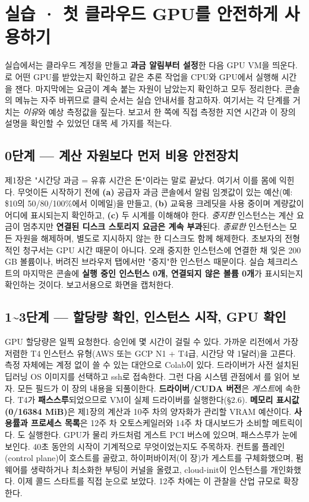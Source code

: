 \section{실습 · 첫 클라우드 GPU를 안전하게 사용하기}

실습에서는 클라우드 계정을 만들고 \textbf{과금 알림부터 설정}한 다음 GPU VM을 띄운다. 로 어떤 GPU를 받았는지 확인하고 같은 추론 작업을 CPU와 GPU에서 실행해 시간을 잰다. 마지막에는 요금이 계속 붙는 자원이 남았는지 확인하고 모두 정리한다. 콘솔의 메뉴는 자주 바뀌므로 클릭 순서는 실습 안내서를 참고하자. 여기서는 각 단계를 거치는 \textit{이유}와 예상 측정값을 짚는다. 보고서 한 쪽에 직접 측정한 지연 시간과 이 장의 설명을 확인할 수 있었던 대목 세 가지를 적는다.

\subsection*{0단계 — 계산 자원보다 먼저 비용 안전장치}

제1장은 "시간당 과금 = 유휴 시간은 돈"이라는 말로 끝났다. 여기서 이를 몸에 익힌다. 무엇이든 시작하기 전에 \textbf{(a)} 공급자 과금 콘솔에서 알림 임곗값이 있는 예산(예: \$10의 50/80/100\%에서 이메일)을 만들고, \textbf{(b)} 교육용 크레딧을 사용 중이며 계량값이 어디에 표시되는지 확인하고, \textbf{(c)} 두 시계를 이해해야 한다. \textit{중지한} 인스턴스는 계산 요금이 멈추지만 \textbf{연결된 디스크 스토리지 요금은 계속 부과}된다. \textit{종료한} 인스턴스는 모든 자원을 해제하며, 별도로 지시하지 않는 한 디스크도 함께 해제한다. 초보자의 전형적인 청구서는 GPU 시간 때문이 아니다. 오래 중지한 인스턴스에 연결한 채 잊은 200 GB 볼륨이나, 버려진 브라우저 탭에서만 "중지"한 인스턴스 때문이다. 실습 체크리스트의 마지막은 콘솔에 \textbf{실행 중인 인스턴스 0개, 연결되지 않은 볼륨 0개}가 표시되는지 확인하는 것이다. 보고서용으로 화면을 캡처한다.

\subsection*{1\textasciitilde{}3단계 — 할당량 확인, 인스턴스 시작, GPU 확인}

GPU 할당량은 일찍 요청한다. 승인에 몇 시간이 걸릴 수 있다. 가까운 리전에서 가장 저렴한 T4 인스턴스 유형(AWS  또는 GCP N1 + T4급, 시간당 약 1달러)을 고른다. 측정 자체에는 계정 없이 쓸 수 있는 대안으로 Colab이 있다. 드라이버가 사전 설치된 딥러닝 OS 이미지를 선택하고 ssh로 접속한다. 그런 다음 시스템 관점에서 를 읽어 보자. 모든 필드가 이 장의 내용을 되풀이한다. \textbf{드라이버/CUDA 버전}은 \textit{게스트}에 속한다. T4가 \textbf{패스스루}되었으므로 VM이 실제 드라이버를 실행한다(§2.6). \textbf{메모리 표시값(0/16384 MiB)}은 제1장의 계산과 10주 차의 양자화가 관리할 VRAM 예산이다. \textbf{사용률과 프로세스 목록}은 12주 차 오토스케일러와 14주 차 대시보드가 소비할 메트릭이다. 도 실행한다. GPU가 물리 카드처럼 게스트 PCI 버스에 있으며, 패스스루가 눈에 보인다. 40초 동안의 시작이 기계적으로 무엇이었는지도 주목하자. 컨트롤 플레인(control plane)이 호스트를 골랐고, 하이퍼바이저(이 장)가 게스트를 구체화했으며, 펌웨어를 생략하거나 최소화한 부팅이 커널을 올렸고, cloud-init이 인스턴스를 개인화했다. 이제 콜드 스타트를 직접 눈으로 보았다. 12주 차에는 이 관찰을 산업 규모로 확장한다.

